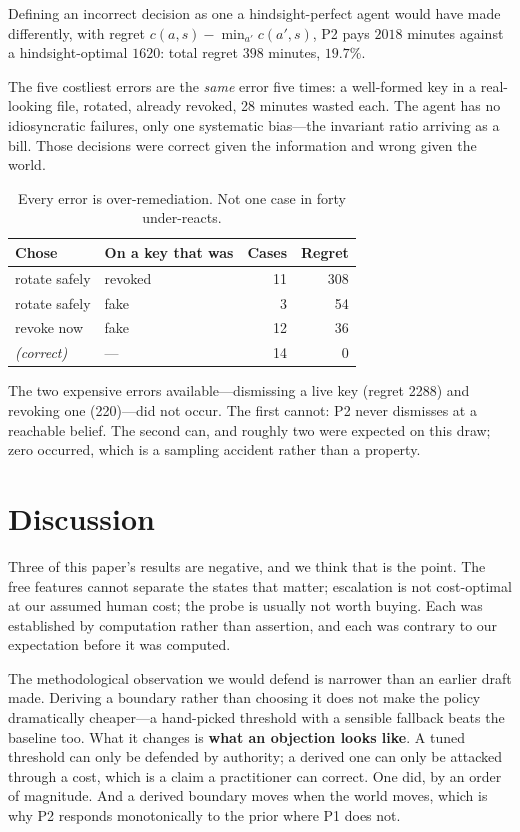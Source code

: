 \documentclass{article}
\begin{document}
\label{sec:regret}

Defining an incorrect decision as one a hindsight-perfect agent would have made
differently, with regret $c(a,s) - \min_{a'} c(a',s)$, P2 pays $2018$ minutes
against a hindsight-optimal $1620$: total regret $398$ minutes, $19.7\%$.

The five costliest errors are the \emph{same} error five times: a well-formed
key in a real-looking file, rotated, already revoked, 28 minutes wasted each.
The agent has no idiosyncratic failures, only one systematic bias---the
invariant ratio arriving as a bill. Those decisions were correct given the
information and wrong given the world.

\begin{table}[t]
\centering
\begin{tabular}{llrr}
\toprule
\textbf{Chose} & \textbf{On a key that was} & \textbf{Cases} & \textbf{Regret} \\
\midrule
rotate safely & revoked & 11 & 308 \\
rotate safely & fake & 3 & 54 \\
revoke now & fake & 12 & 36 \\
\emph{(correct)} & --- & 14 & 0 \\
\bottomrule
\end{tabular}
\caption{Every error is over-remediation. Not one case in forty under-reacts.}
\label{tab:errors}
\end{table}

The two expensive errors available---dismissing a live key (regret 2288) and
revoking one (220)---did not occur. The first cannot: P2 never dismisses at a
reachable belief. The second can, and roughly two were expected on this draw;
zero occurred, which is a sampling accident rather than a property.


\section{Discussion}

Three of this paper's results are negative, and we think that is the point. The
free features cannot separate the states that matter; escalation is not
cost-optimal at our assumed human cost; the probe is usually not worth buying.
Each was established by computation rather than assertion, and each was contrary
to our expectation before it was computed.

The methodological observation we would defend is narrower than an earlier draft
made. Deriving a boundary rather than choosing it does not make the policy
dramatically cheaper---a hand-picked threshold with a sensible fallback beats
the baseline too. What it changes is \textbf{what an objection looks like}. A
tuned threshold can only be defended by authority; a derived one can only be
attacked through a cost, which is a claim a practitioner can correct. One did,
by an order of magnitude. And a derived boundary moves when the world moves,
which is why P2 responds monotonically to the prior where P1 does not.
\end{document}
